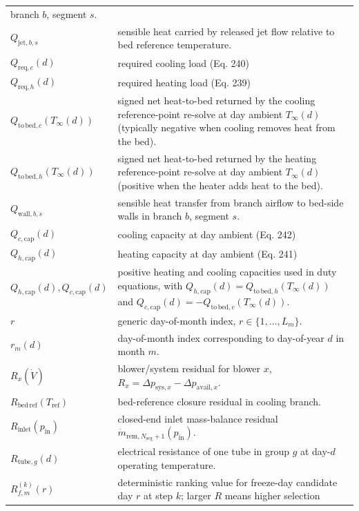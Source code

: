 {\begin{longtable}[]{@{}
  >{\raggedright\arraybackslash}p{}
  >{\raggedright\arraybackslash}p{}@{}}
branch \(b\), segment \(s\). \\
\(Q_{\mathrm{jet},b,s}\) & sensible heat carried by released jet flow
relative to bed reference temperature. \\
\(Q_{\mathrm{req},c}(d)\) & required cooling load (Eq. 240) \\
\(Q_{\mathrm{req},h}(d)\) & required heating load (Eq. 239) \\
\(Q_{\mathrm{to\,bed},c}(T_\infty(d))\) & signed net heat-to-bed
returned by the cooling reference-point re-solve at day ambient
\(T_\infty(d)\) (typically negative when cooling removes heat from the
bed). \\
\(Q_{\mathrm{to\,bed},h}(T_\infty(d))\) & signed net heat-to-bed
returned by the heating reference-point re-solve at day ambient
\(T_\infty(d)\) (positive when the heater adds heat to the bed). \\
\(Q_{\mathrm{wall},b,s}\) & sensible heat transfer from branch airflow
to bed-side walls in branch \(b\), segment \(s\). \\
\(Q_{c,\mathrm{cap}}(d)\) & cooling capacity at day ambient (Eq. 242) \\
\(Q_{h,\mathrm{cap}}(d)\) & heating capacity at day ambient (Eq. 241) \\
\(Q_{h,\mathrm{cap}}(d),Q_{c,\mathrm{cap}}(d)\) & positive heating and
cooling capacities used in duty equations, with
\(Q_{h,\mathrm{cap}}(d)=Q_{\mathrm{to\,bed},h}(T_\infty(d))\) and
\(Q_{c,\mathrm{cap}}(d)=-Q_{\mathrm{to\,bed},c}(T_\infty(d))\). \\
\(r\) & generic day-of-month index, \(r\in\{1,\dots,L_m\}\). \\
\(r_m(d)\) & day-of-month index corresponding to day-of-year \(d\) in
month \(m\). \\
\(R_x(\dot V)\) & blower/system residual for blower \(x\),
\(R_x=\Delta p_{\mathrm{sys},x}-\Delta p_{\mathrm{avail},x}\). \\
\(R_{\mathrm{bed\,ref}}(T_{\mathrm{ref}})\) & bed-reference closure
residual in cooling branch. \\
\(R_{\mathrm{inlet}}(p_{\mathrm{in}})\) & closed-end inlet mass-balance
residual
\(\dot m_{\mathrm{rem},N_{\mathrm{seg}}+1}(p_{\mathrm{in}})\). \\
\(R_{\mathrm{tube},g}(d)\) & electrical resistance of one tube in group
\(g\) at day-\(d\) operating temperature. \\
\(R_{f,m}^{(k)}(r)\) & deterministic ranking value for freeze-day
candidate day \(r\) at step \(k\); larger \(R\) means higher selection

\end{longtable}}

